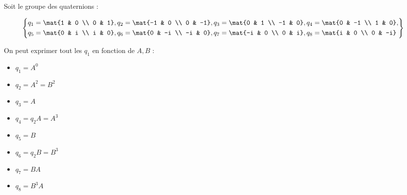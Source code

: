 
Soit le groupe des quaternions :

\[
\left\{
\begin{aligned}
  &q_1 = \mat{1 & 0 \\ 0 & 1},  q_2 = \mat{-1 & 0 \\ 0 & -1},  q_3 = \mat{0 & 1 \\ -1 & 0}, q_4= \mat{0 & -1 \\ 1 & 0}, \\
  &q_5 = \mat{0 & i \\ i & 0},  q_6 = \mat{0 & -i \\ -i & 0}, q_7= \mat{-i & 0 \\ 0 & i},  q_8 = \mat{i & 0 \\ 0 & -i}                   
\end{aligned}
\right\} 
\]

On peut exprimer tout les $q_1$ en fonction de $A, B$ :

\begin{itemize}
  \item $q_1 = A^0$
  \item $q_2 = A^2 = B^2$
  \item $q_3 = A$
  \item $q_4 = q_2A = A^3$
  \item $q_5 = B$
  \item $q_6 = q_2B = B^3$
  \item $q_7 = BA$
  \item $q_8 = B^3A$
\end{itemize}